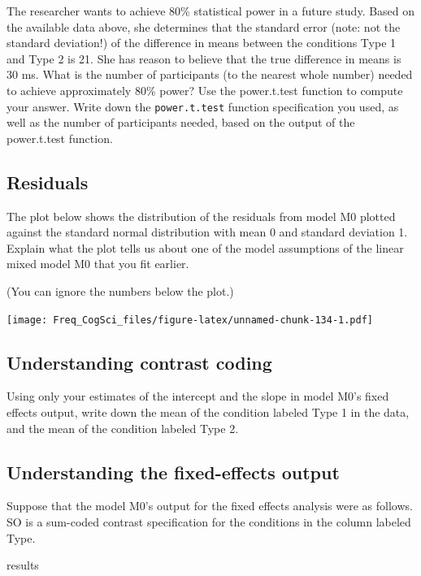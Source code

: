 \documentclass[12pt,]{krantz}
\newenvironment{Shaded}{\begin{snugshade}}{\end{snugshade}}
\newcommand{\NormalTok}[1]{#1}
\begin{document}
The researcher wants to achieve 80\% statistical power in a future study. Based on the available data above, she determines that the standard error (note: not the standard deviation!) of the difference in means between the conditions Type 1 and Type 2 is 21. She has reason to believe that the true difference in means is 30 ms. What is the number of participants (to the nearest whole number) needed to achieve approximately 80\% power? Use the power.t.test function to compute your answer. Write down the \texttt{power.t.test} function specification you used, as well as the number of participants needed, based on the output of the power.t.test function.

\hypertarget{sec:LMExercisesPart5}{%
\subsection{Residuals}\label{sec:LMExercisesPart5}}

The plot below shows the distribution of the residuals from model M0 plotted against the standard normal distribution with mean 0 and standard deviation 1. Explain what the plot tells us about one of the model assumptions of the linear mixed model M0 that you fit earlier.

(You can ignore the numbers below the plot.)

\texttt{[image: Freq\_CogSci\_files/figure-latex/unnamed-chunk-134-1.pdf]}

\hypertarget{sec:LMExercisesPart6}{%
\subsection{Understanding contrast coding}\label{sec:LMExercisesPart6}}

Using only your estimates of the intercept and the slope in model M0's fixed effects output, write down the mean of the condition labeled Type 1 in the data, and the mean of the condition labeled Type 2.

\hypertarget{sec:LMExercisesPart7}{%
\subsection{Understanding the fixed-effects output}\label{sec:LMExercisesPart7}}

Suppose that the model M0's output for the fixed effects analysis were as follows. SO is a sum-coded contrast specification for the conditions in the column labeled Type.

\begin{Shaded}
\begin{Highlighting}[]
\NormalTok{results}
\end{Highlighting}
\end{Shaded}
\end{document}
